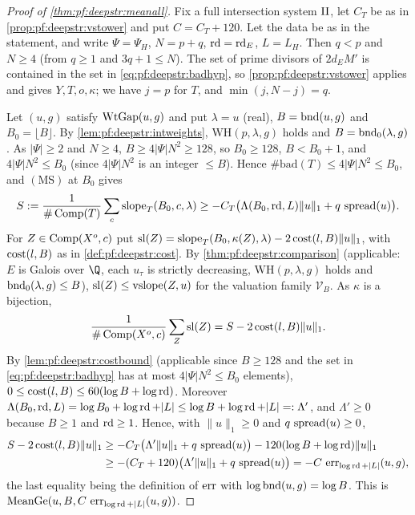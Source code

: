 \begin{proof}[Proof of \cref{thm:pf:deepstr:meanall}]
Fix a full intersection system $\mathrm{II}$, let $C_T$ be as in \cref{prop:pf:deepstr:vstower} and put
$C=C_T+120$. Let the data be as in the statement, and write $\Psi=\Psi_H$, $N=p+q$, $\operatorname{rd}=\operatorname{rd}_E$,
$L=L_H$. Then $q<p$ and $N\ge4$ (from $q\ge1$ and $3q+1\le N$). The set of prime divisors of $2d_EM'$ is
contained in the set in \eqref{eq:pf:deepstr:badhyp}, so \cref{prop:pf:deepstr:vstower} applies and gives
$Y,T,o,\kappa$; we have $j=p$ for $T$, and $\min(j,N-j)=q$.

Let $(u,g)$ satisfy $\operatorname{WtGap}(u,g)$ and put $\lambda=u$ (real), $B=\operatorname{bnd}(u,g)$ and $B_0=\lfloor B\rfloor$.
By \cref{lem:pf:deepstr:intweights}, $\mathrm{WH}(p,\lambda,g)$ holds and $B=\operatorname{bnd}_0(\lambda,g)$. As
$|\Psi|\ge2$ and $N\ge4$, $B\ge4|\Psi|N^2\ge128$, so $B_0\ge128$, $B<B_0+1$, and $4|\Psi|N^2\le B_0$ (since
$4|\Psi|N^2$ is an integer $\le B$). Hence $\#\mathrm{bad}(T)\le4|\Psi|N^2\le B_0$, and
$\mathrm{(MS)}$ at $B_0$ gives
\begin{equation}\label{eq:pf:deepstr:hM}
S:=\frac1{\#\operatorname{Comp}(T)}\sum_{c}\operatorname{slope}_T(B_0,c,\lambda)\ge-C_T\bigl(\Lambda(B_0,\operatorname{rd},L)\|u\|_1+q\,\operatorname{spread}(u)\bigr).
\end{equation}
For $Z\in\operatorname{Comp}(X^o,c)$ put
$\mathrm{sl}(Z)=\operatorname{slope}_T(B_0,\kappa(Z),\lambda)-2\operatorname{cost}(l,B)\|u\|_1$, with $\operatorname{cost}(l,B)$ as in
\cref{def:pf:deepstr:cost}. By \cref{thm:pf:deepstr:comparison} (applicable: $E$ is Galois over $\Q$, each
$u_\tau$ is strictly decreasing, $\mathrm{WH}(p,\lambda,g)$ holds and $\operatorname{bnd}_0(\lambda,g)\le B$),
$\mathrm{sl}(Z)\le\operatorname{vslope}(Z,u)$ for the valuation family $\mathcal V_B$. As $\kappa$ is a bijection,
\[
\frac1{\#\operatorname{Comp}(X^o,c)}\sum_Z\mathrm{sl}(Z)=S-2\operatorname{cost}(l,B)\|u\|_1.
\]
By \cref{lem:pf:deepstr:costbound} (applicable since $B\ge128$ and the set in \eqref{eq:pf:deepstr:badhyp} has at
most $4|\Psi|N^2\le B_0$ elements), $0\le\operatorname{cost}(l,B)\le60(\log B+\log\operatorname{rd})$. Moreover
$\Lambda(B_0,\operatorname{rd},L)=\log B_0+\log\operatorname{rd}+|L|\le\log B+\log\operatorname{rd}+|L|=:\Lambda'$, and
$\Lambda'\ge0$ because $B\ge1$ and $\operatorname{rd}\ge1$. Hence, with $\|u\|_1\ge0$ and $q\,\operatorname{spread}(u)\ge0$,
\begin{align*}
S-2\operatorname{cost}(l,B)\|u\|_1&\ge-C_T\bigl(\Lambda'\|u\|_1+q\,\operatorname{spread}(u)\bigr)-120(\log B+\log\operatorname{rd})\|u\|_1\\
&\ge-(C_T+120)\bigl(\Lambda'\|u\|_1+q\,\operatorname{spread}(u)\bigr)=-C\,\operatorname{err}_{\log\operatorname{rd}+|L|}(u,g),
\end{align*}
the last equality being the definition of $\operatorname{err}$ with $\log\operatorname{bnd}(u,g)=\log B$. This is
$\operatorname{MeanGe}(u,B,C\,\operatorname{err}_{\log\operatorname{rd}+|L|}(u,g))$.
\end{proof}

